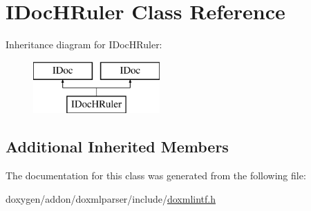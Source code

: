 \hypertarget{class_i_doc_h_ruler}{}\section{I\+Doc\+H\+Ruler Class Reference}
\label{class_i_doc_h_ruler}
Inheritance diagram for I\+Doc\+H\+Ruler\+:\begin{figure}[H]
\begin{center}
\leavevmode
\includegraphics[height=2.000000cm]{class_i_doc_h_ruler}
\end{center}
\end{figure}
\subsection*{Additional Inherited Members}


The documentation for this class was generated from the following file\+:\begin{DoxyCompactItemize}
\item 
doxygen/addon/doxmlparser/include/\mbox{\hyperlink{include_2doxmlintf_8h}{doxmlintf.\+h}}\end{DoxyCompactItemize}
